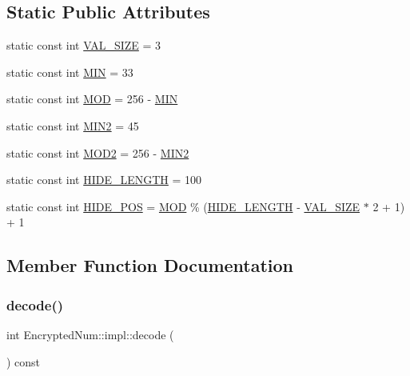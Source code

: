 \subsection*{Static Public Attributes}
\begin{DoxyCompactItemize}
\item 
static const int \mbox{\hyperlink{class_encrypted_num_1_1impl_a6e664a6fc52249259aac82d66303985b}{V\+A\+L\+\_\+\+S\+I\+ZE}} = 3
\item 
static const int \mbox{\hyperlink{class_encrypted_num_1_1impl_abf3ff37aa3651230bcec922786f12d6f}{M\+IN}} = 33
\item 
static const int \mbox{\hyperlink{class_encrypted_num_1_1impl_ae4da18b79a80c25724909f98a82256aa}{M\+OD}} = 256 -\/ \mbox{\hyperlink{class_encrypted_num_1_1impl_abf3ff37aa3651230bcec922786f12d6f}{M\+IN}}
\item 
static const int \mbox{\hyperlink{class_encrypted_num_1_1impl_a6f7dc59b1a615385d43152a7b92d9617}{M\+I\+N2}} = 45
\item 
static const int \mbox{\hyperlink{class_encrypted_num_1_1impl_a1444f7d8b000eae231bfe860c992463a}{M\+O\+D2}} = 256 -\/ \mbox{\hyperlink{class_encrypted_num_1_1impl_a6f7dc59b1a615385d43152a7b92d9617}{M\+I\+N2}}
\item 
static const int \mbox{\hyperlink{class_encrypted_num_1_1impl_a38b492ed651258700bebf0c4c39886a2}{H\+I\+D\+E\+\_\+\+L\+E\+N\+G\+TH}} = 100
\item 
static const int \mbox{\hyperlink{class_encrypted_num_1_1impl_a2cc2afd375cca95b11647aedad95427d}{H\+I\+D\+E\+\_\+\+P\+OS}} = \mbox{\hyperlink{class_encrypted_num_1_1impl_ae4da18b79a80c25724909f98a82256aa}{M\+OD}} \% (\mbox{\hyperlink{class_encrypted_num_1_1impl_a38b492ed651258700bebf0c4c39886a2}{H\+I\+D\+E\+\_\+\+L\+E\+N\+G\+TH}} -\/ \mbox{\hyperlink{class_encrypted_num_1_1impl_a6e664a6fc52249259aac82d66303985b}{V\+A\+L\+\_\+\+S\+I\+ZE}} $\ast$ 2 + 1) + 1
\end{DoxyCompactItemize}


\subsection{Member Function Documentation}
\mbox{\label{class_encrypted_num_1_1impl_acfb8cdcba7ef98973ae0ad981849bb43}} 
\subsubsection{\texorpdfstring{decode()}{decode()}}
{\footnotesize\ttfamily int Encrypted\+Num\+::impl\+::decode (\begin{DoxyParamCaption}{ }\end{DoxyParamCaption}) const}

